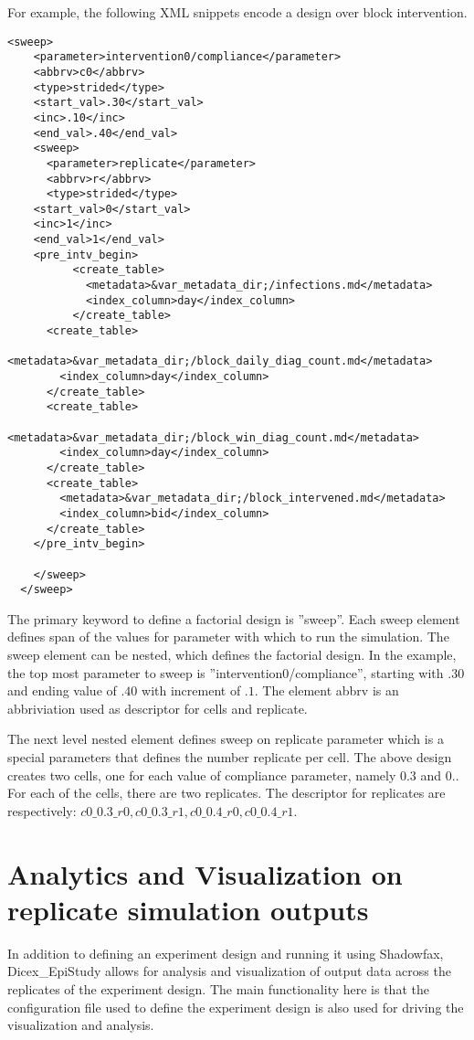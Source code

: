 \documentclass[11]{report}
\begin{document}
For example, the following XML snippets encode a design over block intervention.
\begin{lstlisting}[style=XML]
  <sweep> 
    <parameter>intervention0/compliance</parameter>
    <abbrv>c0</abbrv>
    <type>strided</type>
    <start_val>.30</start_val>
    <inc>.10</inc>
    <end_val>.40</end_val>
    <sweep>
      <parameter>replicate</parameter>
      <abbrv>r</abbrv>
      <type>strided</type>
	<start_val>0</start_val>
	<inc>1</inc>
	<end_val>1</end_val>
	<pre_intv_begin>
          <create_table>
            <metadata>&var_metadata_dir;/infections.md</metadata>
            <index_column>day</index_column>
          </create_table>
	  <create_table>
	    <metadata>&var_metadata_dir;/block_daily_diag_count.md</metadata>
	    <index_column>day</index_column>
	  </create_table>
	  <create_table>
	    <metadata>&var_metadata_dir;/block_win_diag_count.md</metadata>
	    <index_column>day</index_column>
	  </create_table>
	  <create_table>
	    <metadata>&var_metadata_dir;/block_intervened.md</metadata>
	    <index_column>bid</index_column>
	  </create_table>
	</pre_intv_begin>

    </sweep>
  </sweep>
\end{lstlisting}
The primary keyword to define a  factorial design is ''sweep''. Each sweep element defines
span of the values for parameter with which to run the simulation.
The sweep element can be nested, which defines the factorial design.
In the example, the top most parameter to sweep is ''intervention0/compliance'',
starting with $.30$ and ending value of $.40$ with increment of $.1$.
The element abbrv is an abbriviation used as descriptor for cells and replicate.

The next level nested element defines sweep on replicate parameter which is a special
parameters that defines the number replicate per cell.
The above design creates two cells, one for each value of compliance parameter, namely $0.3$ and
$0.$. For each of the cells, there are two replicates.
The descriptor for replicates are respectively:
$c0\_0.3\_r0,c0\_0.3\_r1,c0\_0.4\_r0,c0\_0.4\_r1$.





  
\chapter{Analytics and Visualization on replicate simulation outputs}
In addition to defining an experiment design and running it using Shadowfax, Dicex\_EpiStudy allows for analysis and visualization of output data across the replicates of the experiment design. 
The main functionality here is that the  configuration file used to define the experiment
design is also used for driving the visualization and analysis. 
\end{document}
